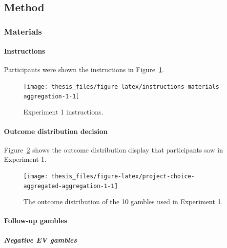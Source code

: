 \documentclass[a4paper, nobind, dvipsnames]{templates/ociamthesis}
\theoremstyle{definition}
\theoremstyle{definition}
\theoremstyle{definition}
\theoremstyle{definition}
\theoremstyle{remark}
\begin{document}
\subsection{Method}

\subsubsection{Materials}

\hypertarget{instructions-materials-aggregation-1-appendix}{%
\paragraph{Instructions}\label{instructions-materials-aggregation-1-appendix}}

Participants were shown the instructions in
Figure~\ref{fig:instructions-materials-aggregation-1}.



\begin{figure}
\texttt{[image: thesis\_files/figure-latex/instructions-materials-aggregation-1-1]} \caption{Experiment 1 instructions.}\label{fig:instructions-materials-aggregation-1}
\end{figure}

\hypertarget{outcome-distribution-materials-aggregation-1-appendix}{%
\paragraph{Outcome distribution decision}\label{outcome-distribution-materials-aggregation-1-appendix}}

Figure~\ref{fig:project-choice-aggregated-aggregation-1} shows the outcome
distribution display that participants saw in Experiment 1.



\begin{figure}
\texttt{[image: thesis\_files/figure-latex/project-choice-aggregated-aggregation-1-1]} \caption{The outcome distribution of the 10 gambles used in Experiment 1.}\label{fig:project-choice-aggregated-aggregation-1}
\end{figure}

\hypertarget{follow-up-materials-aggregation-1-appendix}{%
\paragraph{Follow-up gambles}\label{follow-up-materials-aggregation-1-appendix}}

\subparagraph{Negative EV gambles}
\end{document}
